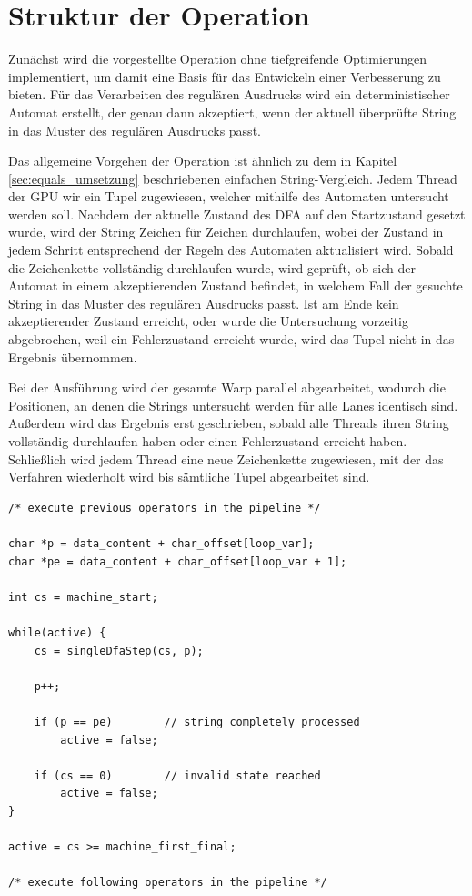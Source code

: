 \section{Struktur der Operation}

Zunächst wird die vorgestellte Operation ohne tiefgreifende Optimierungen implementiert, um damit eine Basis für das Entwickeln einer Verbesserung zu bieten.
Für das Verarbeiten des regulären Ausdrucks wird ein deterministischer Automat erstellt, der genau dann akzeptiert, wenn der aktuell überprüfte String in das Muster des regulären Ausdrucks passt.

Das allgemeine Vorgehen der Operation ist ähnlich zu dem in Kapitel \ref{sec:equals_umsetzung} beschriebenen einfachen String-Vergleich.
Jedem Thread der GPU wir ein Tupel zugewiesen, welcher mithilfe des Automaten untersucht werden soll.
Nachdem der aktuelle Zustand des DFA auf den Startzustand gesetzt wurde, wird der String Zeichen für Zeichen durchlaufen, wobei der Zustand in jedem Schritt entsprechend der Regeln des Automaten aktualisiert wird.
Sobald die Zeichenkette vollständig durchlaufen wurde, wird geprüft, ob sich der Automat in einem akzeptierenden Zustand befindet, in welchem Fall der gesuchte String in das Muster des regulären Ausdrucks passt.
Ist am Ende kein akzeptierender Zustand erreicht, oder wurde die Untersuchung vorzeitig abgebrochen, weil ein Fehlerzustand erreicht wurde, wird das Tupel nicht in das Ergebnis übernommen.

Bei der Ausführung wird der gesamte Warp parallel abgearbeitet, wodurch die Positionen, an denen die Strings untersucht werden für alle Lanes identisch sind.
Außerdem wird das Ergebnis erst geschrieben, sobald alle Threads ihren String vollständig durchlaufen haben oder einen Fehlerzustand erreicht haben.
Schließlich wird jedem Thread eine neue Zeichenkette zugewiesen, mit der das Verfahren wiederholt wird bis sämtliche Tupel abgearbeitet sind.

\newpage

\begin{lstlisting}[language=MyC++,
caption=Naive Implementierung einer Selektion mit einem regulären Ausdruck,
label=naive_regex]
/* execute previous operators in the pipeline */

char *p = data_content + char_offset[loop_var];
char *pe = data_content + char_offset[loop_var + 1];

int cs = machine_start;

while(active) {
	cs = singleDfaStep(cs, p);
	
	p++;
	
	if (p == pe)		// string completely processed
		active = false;
	
	if (cs == 0)		// invalid state reached
		active = false;
}

active = cs >= machine_first_final;

/* execute following operators in the pipeline */
\end{lstlisting}

